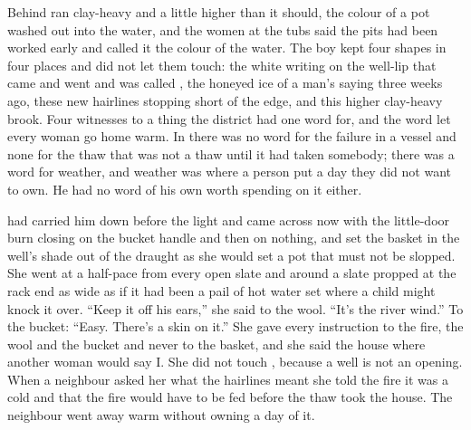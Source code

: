 \scenebreak

Behind   ran clay-heavy and a little higher than it should, the colour of a pot washed out into the water, and the women at the tubs said the pits had been worked early and called it the colour of the water. The boy kept four shapes in four places and did not let them touch: the white writing on the well-lip that came and went and was called , the honeyed ice of a man's saying three weeks ago, these new hairlines stopping short of the edge, and this higher clay-heavy brook. Four witnesses to a thing the district had one word for, and the word let every woman go home warm. In  there was no word for the failure in a vessel and none for the thaw that was not a thaw until it had taken somebody; there was a word for weather, and weather was where a person put a day they did not want to own. He had no word of his own worth spending on it either.

 had carried him down before the light and came across now with the little-door burn closing on the bucket handle and then on nothing, and set the basket in the well's shade out of the draught as she would set a pot that must not be slopped. She went at a half-pace from every open slate and around a slate propped at the rack end as wide as if it had been a pail of hot water set where a child might knock it over. “Keep it off his ears,” she said to the wool. “It's the river wind.” To the bucket: “Easy. There's a skin on it.” She gave every instruction to the fire, the wool and the bucket and never to the basket, and she said the house where another woman would say I. She did not touch , because a well is not an opening. When a neighbour asked her what the hairlines meant she told the fire it was a cold and that the fire would have to be fed before the thaw took the house. The neighbour went away warm without owning a day of it.

